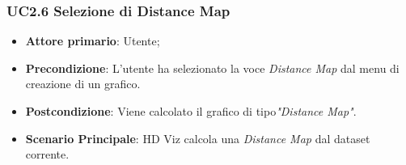\subsubsection{UC2.6 Selezione di Distance Map}
\label{ssub:UC2.6}
\begin{itemize}
	\item \textbf{Attore primario}:		Utente;
	\item \textbf{Precondizione}:		L'utente ha selezionato la voce \emph{Distance Map} dal menu di creazione di un grafico.
	\item \textbf{Postcondizione}:		Viene calcolato il grafico di tipo\emph{"Distance Map"}.
	\item \textbf{Scenario Principale}: HD Viz calcola una  \emph{Distance Map} dal dataset corrente.
\end{itemize}